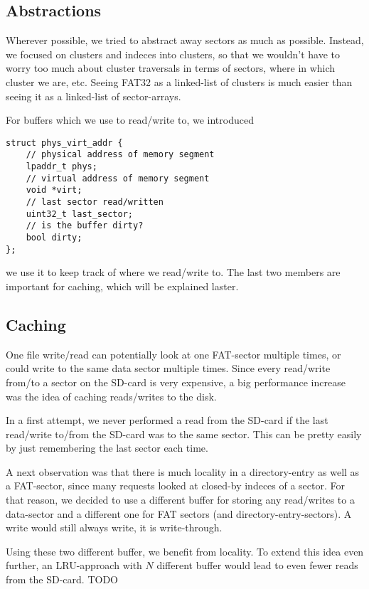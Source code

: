 \subsection{Abstractions}
Wherever possible, we tried to abstract away sectors as much as possible.
Instead, we focused on clusters and indeces into clusters, so that 
we wouldn't have to worry too much about cluster traversals in terms of 
sectors, where in which cluster we are, etc. Seeing FAT32 as a linked-list 
of clusters is much easier than seeing it as a linked-list of sector-arrays.

For buffers which we use to read/write to, we introduced 
\begin{verbatim}
struct phys_virt_addr {
    // physical address of memory segment
    lpaddr_t phys;
    // virtual address of memory segment
    void *virt;
    // last sector read/written
    uint32_t last_sector;
    // is the buffer dirty?
    bool dirty;
};
\end{verbatim}
we use it to keep track of where we read/write to. The last two members 
are important for caching, which will be explained laster.




\subsection{Caching}
One file write/read can potentially look at one FAT-sector multiple times,
or could write to the same data sector multiple times. Since every 
read/write from/to a sector on the SD-card is very expensive, a big 
performance increase was the idea of caching reads/writes to the disk.

In a first attempt, we never performed a read from the SD-card if 
the last read/write to/from the SD-card was to the same sector. This can 
be pretty easily by just remembering the last sector each time.

A next observation was that there is much locality in a directory-entry 
as well as a FAT-sector, since many requests looked at closed-by indeces
of a sector. For that reason, we decided to use a different buffer 
for storing any read/writes to a data-sector and a different one for 
FAT sectors (and directory-entry-sectors). 
A write would still always write, it is write-through.

Using these two different buffer, we benefit from locality.
To extend this idea even further, an LRU-approach with $N$ different 
buffer would lead to even fewer reads from the SD-card.
TODO

